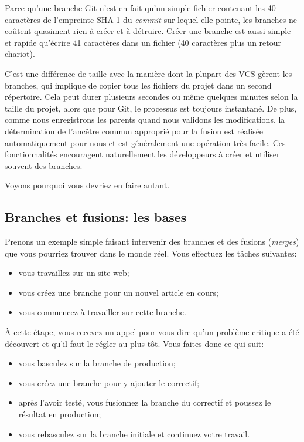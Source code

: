 Parce qu'une branche Git n'est en fait qu'un simple fichier contenant les 40 caractères de l'empreinte SHA-1 du \emph{commit} sur lequel elle pointe, les branches ne coûtent quasiment rien à créer et à détruire.
Créer une branche est aussi simple et rapide qu'écrire 41 caractères dans un fichier (40 caractères plus un retour chariot).

C'est une différence de taille avec la manière dont la plupart des VCS gèrent les branches, qui implique de copier tous les fichiers du projet dans un second répertoire.
Cela peut durer plusieurs secondes ou même quelques minutes selon la taille du projet, alors que pour Git, le processus est toujours instantané.
De plus, comme nous enregistrons les parents quand nous validons les modifications, la détermination de l'ancêtre commun approprié pour la fusion est réalisée automatiquement pour nous et est généralement une opération très facile.
Ces fonctionnalités encouragent naturellement les développeurs à créer et utiliser souvent des branches.

Voyons pourquoi vous devriez en faire autant.

\subsection{Branches et fusions: les bases}

Prenons un exemple simple faisant intervenir des branches et des fusions (\emph{merges}) que vous pourriez trouver dans le monde réel.
Vous effectuez les tâches suivantes:

\begin{itemize}
\item vous travaillez sur un site web;
\item vous créez une branche pour un nouvel article en cours;
\item vous commencez à travailler sur cette branche.
\end{itemize}

À cette étape, vous recevez un appel pour vous dire qu'un problème critique a été découvert et qu'il faut le régler au plus tôt.
Vous faites donc ce qui suit:

\begin{itemize}
\item vous basculez sur la branche de production;
\item vous créez une branche pour y ajouter le correctif;
\item après l'avoir testé, vous fusionnez la branche du correctif et poussez le résultat en production;
\item vous rebasculez sur la branche initiale et continuez votre travail.
\end{itemize}


